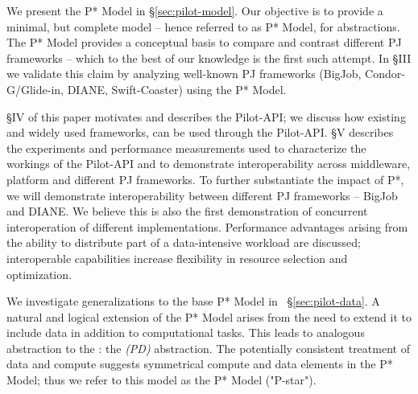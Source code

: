 \documentclass{sig-alternate}
\begin{document}


We present the P* Model in \S\ref{sec:pilot-model}.  Our objective is to provide a
minimal, but complete model -- hence referred to as P* Model, for
\pilotjob abstractions.  The P* Model provides a conceptual basis
to compare and contrast different PJ frameworks -- which to the best of
our knowledge is the first such attempt. In \S{III} we validate this
claim by analyzing well-known PJ frameworks (BigJob,
Condor-G/Glide-in, DIANE, Swift-Coaster) using the P* Model.



\S{IV} of this paper motivates and describes the Pilot-API;  we
discuss how %
existing and widely used \pilotjob frameworks, can be used through the
Pilot-API.  \S{V} describes the experiments and performance
measurements used to characterize the workings of the Pilot-API and to
demonstrate interoperability across middleware, platform and different
PJ frameworks.  To further substantiate the impact of P*, we will
demonstrate interoperability between different PJ frameworks -- BigJob
and DIANE. We believe this is also the first demonstration of
concurrent interoperation of different \pilotjob implementations.
Performance advantages arising from the ability to distribute part of a
data-intensive workload are discussed; interoperable capabilities
increase flexibility in resource selection and optimization.

We investigate generalizations to the base P* Model
in \ \S\ref{sec:pilot-data}.  A natural and logical extension of the
P* Model arises from the need to extend it to include data in
addition to computational tasks.  This leads to analogous abstraction
to the \pilotjob: the \emph{\pilotdata (PD)} abstraction.  The
potentially consistent treatment of data and compute suggests
symmetrical compute and data elements in the P* Model; thus we refer
to this model as the P* Model ("P-star").
\end{document}
